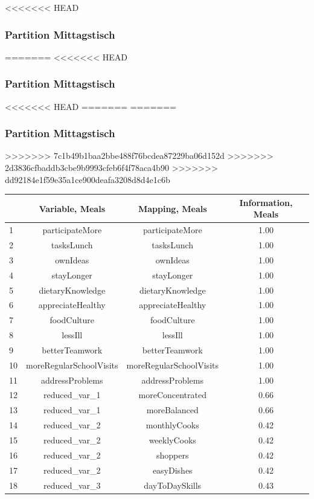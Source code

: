 <<<<<<< HEAD
 \begin{frame}[fragile]
 \frametitle{Partition Mittagstisch}
=======
<<<<<<< HEAD
\begin{frame}[fragile]
\frametitle{Partition Mittagstisch}
<<<<<<< HEAD
=======
=======
 \begin{frame}[fragile]
 \frametitle{Partition Mittagstisch}
>>>>>>> 7c1b49b1baa2bbe488f76bcdea87229ba06d152d
>>>>>>> 2d3836cfbaddb3cbe9b9993cfeb6f4f78aca4b90
>>>>>>> dd92184e1f59e35a1ce900deafa3208d8d4e1c6b
\begin{table}[ht]
\centering
\begin{tabular}{lccc}
  \hline
 & Variable, Meals & Mapping, Meals & Information, Meals \\ 
  \hline
1 & participateMore & participateMore & 1.00 \\ 
  2 & tasksLunch & tasksLunch & 1.00 \\ 
  3 & ownIdeas & ownIdeas & 1.00 \\ 
  4 & stayLonger & stayLonger & 1.00 \\ 
  5 & dietaryKnowledge & dietaryKnowledge & 1.00 \\ 
  6 & appreciateHealthy & appreciateHealthy & 1.00 \\ 
  7 & foodCulture & foodCulture & 1.00 \\ 
  8 & lessIll & lessIll & 1.00 \\ 
  9 & betterTeamwork & betterTeamwork & 1.00 \\ 
  10 & moreRegularSchoolVisits & moreRegularSchoolVisits & 1.00 \\ 
  11 & addressProblems & addressProblems & 1.00 \\ 
  12 & reduced\_var\_1 & moreConcentrated & 0.66 \\ 
  13 & reduced\_var\_1 & moreBalanced & 0.66 \\ 
  14 & reduced\_var\_2 & monthlyCooks & 0.42 \\ 
  15 & reduced\_var\_2 & weeklyCooks & 0.42 \\ 
  16 & reduced\_var\_2 & shoppers & 0.42 \\ 
  17 & reduced\_var\_2 & easyDishes & 0.42 \\ 
  18 & reduced\_var\_3 & dayToDaySkills & 0.43 \\ 

\end{tabular}
\end{table}
\end{frame}
\end{frame}
\end{frame}
